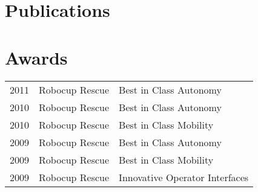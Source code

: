 \documentclass[a4paper]{awesome-deedy}
\begin{document}
\begin{minipage}[t]{0.66\textwidth}

%

\end{minipage}

\begin{minipage}[t]{0.95\textwidth} 

\section{Publications}

%
%
\nocite{InfVis2001A, InfVis2001B, VisSoft2002, %
IJHCS2004, InfVis2002, SoftVis2003, Framescript, JFR2011, ICRA2011, ACRA2009, IPIN2012, ACRA2012, Robocup2011, IROS2013}

\printbibliography[title={Journals}, type=article, heading=subbibliography]
\printbibliography[title={Conferences}, type=inproceedings, heading=subbibliography]
\printbibliography[title={Other}, nottype=article, nottype=inproceedings, heading=subbibliography]


\section{Awards} 
\begin{tabular}{rll}
2011	     & Robocup Rescue  & Best in Class Autonomy \\
2010	     & Robocup Rescue  & Best in Class Autonomy \\
2010	     & Robocup Rescue  & Best in Class Mobility \\
2009	     & Robocup Rescue  & Best in Class Autonomy \\
2009	     & Robocup Rescue  & Best in Class Mobility \\
2009	     & Robocup Rescue  & Innovative Operator Interfaces \\
\end{tabular}
\sectionsep

\end{minipage}
\end{document}
